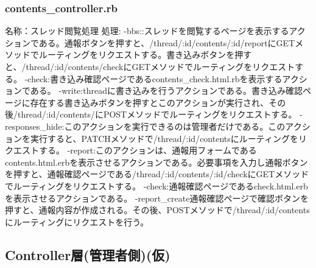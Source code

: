 \documentclass[a4j]{jarticle}
\begin{document}
\subsubsection{contents\_controller.rb}
\noindent 名称：スレッド閲覧処理 \newline
処理:\newline
-bbs::スレッドを閲覧するページを表示するアクションである。通報ボタンを押すと、/thread/:id/contents/:id/reportにGETメソッドでルーティングをリクエストする。書き込みボタンを押すと、/thread/:id/contents/checkにGETメソッドでルーティングをリクエストする。\newline
-check:書き込み確認ページであるcontents\_check.html.rbを表示するアクションである。\newline
-write:threadに書き込みを行うアクションである。書き込み確認ページに存在する書き込みボタンを押すとこのアクションが実行され、その後/thread/:id/contents/にPOSTメソッドでルーティングをリクエストする。\newline
-responses\_hide:このアクションを実行できるのは管理者だけである。このアクションを実行すると、PATCHメソッドで/thread/:id/contentsにルーティングをリクエストする。\newline
-report:このアクションは、通報用フォームであるcontents.html.erbを表示させるアクションである。必要事項を入力し通報ボタンを押すと、通報確認ページである/thread/:id/contents/:id/checkにGETメソッドでルーティングをリクエストする。\newline
-check:通報確認ページであるcheck.html.erbを表示させるアクションである。\newline
-report\_create通報確認ページで確認ボタンを押すと、通報内容が作成される。その後、POSTメソッドで/thread/:id/contentsにルーティングにリクエストを行う。



\subsection{Controller層(管理者側)(仮)}
\end{document}

